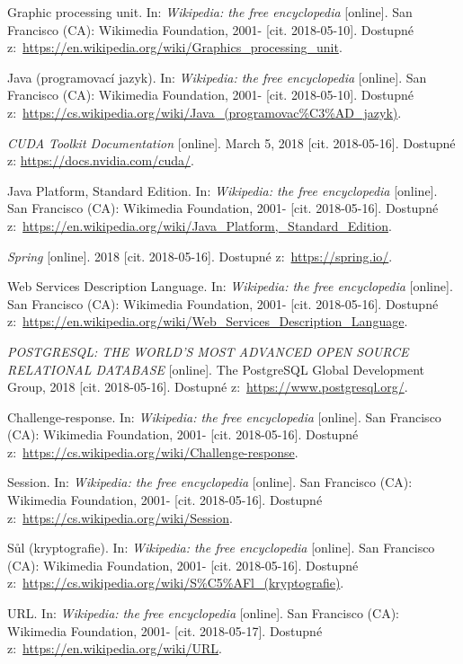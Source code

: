 \documentclass[a4paper,12pt]{article}
\begin{document}
{  Graphic processing unit. In: \textit{Wikipedia: the free encyclopedia} [online]. San Francisco (CA): Wikimedia Foundation, 2001- [cit. 2018-05-10]. Dostupné z:~\url{https://en.wikipedia.org/wiki/Graphics_processing_unit}.
  
  Java (programovací jazyk). In: \textit{Wikipedia: the free encyclopedia} [online]. San Francisco (CA): Wikimedia Foundation, 2001- [cit. 2018-05-10]. Dostupné z:~\url{https://cs.wikipedia.org/wiki/Java_(programovac\%C3\%AD_jazyk)}.
  
  \textit{CUDA Toolkit Documentation} [online]. March 5, 2018 [cit. 2018-05-16]. Dostupné z: \url{https://docs.nvidia.com/cuda/}.
  
  Java Platform, Standard Edition. In: \textit{Wikipedia: the free encyclopedia} [online]. San Francisco (CA): Wikimedia Foundation, 2001- [cit. 2018-05-16]. Dostupné z:~\url{https://en.wikipedia.org/wiki/Java_Platform,_Standard_Edition}.
  
  \textit{Spring} [online]. 2018 [cit. 2018-05-16]. Dostupné z:~\url{https://spring.io/}.
  
  Web Services Description Language. In: \textit{Wikipedia: the free encyclopedia} [online]. San Francisco (CA): Wikimedia Foundation, 2001- [cit. 2018-05-16]. Dostupné z:~\url{https://en.wikipedia.org/wiki/Web_Services_Description_Language}.
  
  \textit{POSTGRESQL: THE WORLD'S MOST ADVANCED OPEN SOURCE RELATIONAL DATABASE} [online]. The PostgreSQL Global Development Group, 2018 [cit. 2018-05-16]. Dostupné z:~\url{https://www.postgresql.org/}.
  
  Challenge-response. In: \textit{Wikipedia: the free encyclopedia} [online]. San Francisco (CA): Wikimedia Foundation, 2001- [cit. 2018-05-16]. Dostupné z:~\url{https://cs.wikipedia.org/wiki/Challenge-response}.
  
  Session. In: \textit{Wikipedia: the free encyclopedia} [online]. San Francisco (CA): Wikimedia Foundation, 2001- [cit. 2018-05-16]. Dostupné z:~\url{https://cs.wikipedia.org/wiki/Session}.
  
  Sůl (kryptografie). In:\textit{ Wikipedia: the free encyclopedia} [online]. San Francisco (CA): Wikimedia Foundation, 2001- [cit. 2018-05-16]. Dostupné z:~\url{https://cs.wikipedia.org/wiki/S\%C5\%AFl_(kryptografie)}.
  
  URL. In: \textit{Wikipedia: the free encyclopedia} [online]. San Francisco (CA): Wikimedia Foundation, 2001- [cit. 2018-05-17]. Dostupné z:~\url{https://en.wikipedia.org/wiki/URL}.
  
}
\end{document}
